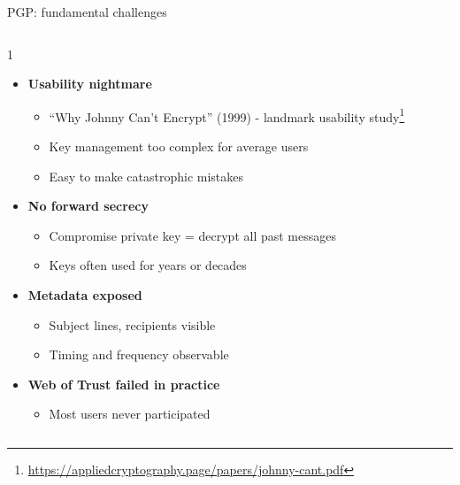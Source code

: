 \documentclass[aspectratio=169, lualatex, handout]{beamer}
\begin{document}
\begin{frame}{PGP: fundamental challenges}
	\begin{columns}[c]
		\begin{column}{1\textwidth}
			\begin{itemize}
				\item \textbf{Usability nightmare}
				      \begin{itemize}
					      \item ``Why Johnny Can't Encrypt'' (1999) - landmark usability study\footnote{\url{https://appliedcryptography.page/papers/johnny-cant.pdf}}
					      \item Key management too complex for average users
					      \item Easy to make catastrophic mistakes
				      \end{itemize}
				\item \textbf{No forward secrecy}
				      \begin{itemize}
					      \item Compromise private key = decrypt all past messages
					      \item Keys often used for years or decades
				      \end{itemize}
				\item \textbf{Metadata exposed}
				      \begin{itemize}
					      \item Subject lines, recipients visible
					      \item Timing and frequency observable
				      \end{itemize}
				\item \textbf{Web of Trust failed in practice}
				      \begin{itemize}
					      \item Most users never participated
				      \end{itemize}
			\end{itemize}
		\end{column}
	\end{columns}
\end{frame}
\end{document}
